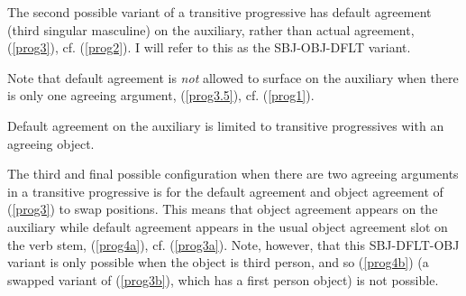 \documentclass[output=paper
,modfonts
,nonflat]{langsci/langscibook}
\begin{document}
The second possible variant of a transitive progressive has default agreement (third singular masculine) on the auxiliary, rather than actual agreement, (\ref{prog3}), cf. (\ref{prog2}). I will refer to this as the SBJ-OBJ-DFLT variant.

\eal \label{prog3}
\zl

\noindent Note that default agreement is \textit{not} allowed to surface on the auxiliary when there is only one agreeing argument, (\ref{prog3.5}), cf. (\ref{prog1}).

\eal \label{prog3.5}
\zl

\noindent Default agreement on the auxiliary is limited to transitive progressives with an agreeing object.

The third and final possible configuration when there are two agreeing arguments in a transitive progressive is for the default agreement and object agreement of (\ref{prog3}) to swap positions. This means that object agreement appears on the auxiliary while default agreement appears in the usual object agreement slot on the verb stem, (\ref{prog4a}), cf. (\ref{prog3a}). Note, however, that this SBJ-DFLT-OBJ variant is only possible when the object is third person, and so (\ref{prog4b}) (a swapped variant of (\ref{prog3b}), which has a first person object) is not possible.

\eal \label{prog4}
\zl
\end{document}
